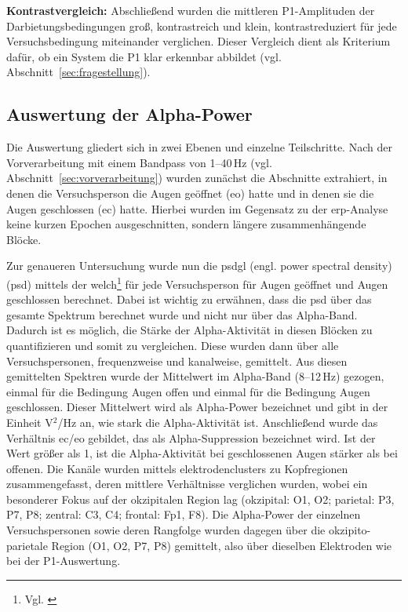 \textbf{Kontrastvergleich:} Abschließend wurden die mittleren P1-Amplituden der Darbietungsbedingungen groß, kontrastreich und klein, kontrastreduziert für jede Versuchsbedingung miteinander verglichen. Dieser Vergleich dient als Kriterium dafür, ob ein System die P1 klar erkennbar abbildet (vgl. Abschnitt~\ref{sec:fragestellung}).

\subsection{Auswertung der Alpha-Power}
\label{sec:alphaauswertung}
Die Auswertung gliedert sich in zwei Ebenen und einzelne Teilschritte. Nach der Vorverarbeitung mit einem Bandpass von 1--40\,Hz (vgl. Abschnitt~\ref{sec:vorverarbeitung}) wurden zunächst die Abschnitte extrahiert, in denen die Versuchsperson die Augen geöffnet (\acrshort{eo}) hatte und in denen sie die Augen geschlossen (\acrshort{ec}) hatte. Hierbei wurden im Gegensatz zu der \acrshort{erp}-Analyse keine kurzen Epochen ausgeschnitten, sondern längere zusammenhängende Blöcke.

Zur genaueren Untersuchung wurde nun die \gls{psdgl} (engl. power spectral density) (\acrshort{psd}) mittels der \gls{welch}\footnote{Vgl. \cite[S.~70--73]{welch1967}} für jede Versuchsperson für \glqq Augen geöffnet\grqq{} und \glqq Augen geschlossen\grqq{} berechnet. Dabei ist wichtig zu erwähnen, dass die \acrshort{psd} über das gesamte Spektrum berechnet wurde und nicht nur über das Alpha-Band.  Dadurch ist es möglich, die Stärke der Alpha-Aktivität in diesen Blöcken zu quantifizieren und somit zu vergleichen. Diese  wurden dann über alle Versuchspersonen, frequenzweise und kanalweise, gemittelt. Aus diesen gemittelten Spektren wurde der Mittelwert im Alpha-Band (8--12\,Hz) gezogen, einmal für die Bedingung Augen offen und einmal für die Bedingung Augen geschlossen. Dieser Mittelwert wird als Alpha-Power bezeichnet und gibt in der Einheit \textmu V$^2$/Hz an, wie stark die Alpha-Aktivität ist. Anschließend wurde das Verhältnis \acrshort{ec}/\acrshort{eo} gebildet, das als Alpha-Suppression bezeichnet wird. Ist der Wert größer als 1, ist die Alpha-Aktivität bei geschlossenen Augen stärker als bei offenen. Die Kanäle wurden mittels \glspl{elektrodencluster} zu Kopfregionen zusammengefasst, deren mittlere Verhältnisse verglichen wurden, wobei ein besonderer Fokus auf der okzipitalen Region lag (okzipital: O1, O2; parietal: P3, P7, P8; zentral: C3, C4; frontal: Fp1, F8). Die Alpha-Power der einzelnen Versuchspersonen sowie deren Rangfolge wurden dagegen über die okzipito-parietale Region (O1, O2, P7, P8) gemittelt, also über dieselben Elektroden wie bei der P1-Auswertung.

